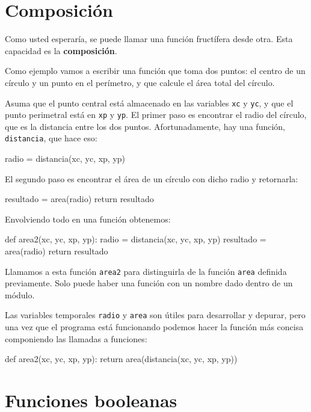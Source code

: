 \section{Composición}

 

Como usted esperaría, se puede llamar una función fructífera desde
otra. Esta capacidad es la \textbf{composición}.

Como ejemplo vamos a escribir una función que toma dos puntos: el
centro de un círculo y un punto en el perímetro, y que calcule el
área total del círculo.

Asuma que el punto central está almacenado en las variables \texttt{xc}
y \texttt{yc}, y que el punto perimetral está en \texttt{xp} y \texttt{yp}.
El primer paso es encontrar el radio del círculo, que es la distancia
entre los dos puntos. Afortunadamente, hay una función, \texttt{distancia},
que hace eso:

\begin{pythoncode}
radio = distancia(xc, yc, xp, yp)
\end{pythoncode}

El segundo paso es encontrar el área de un círculo con dicho radio
y retornarla:

\begin{pythoncode}
resultado = area(radio)
return resultado
\end{pythoncode}
 Envolviendo todo en una función obtenemos:

\begin{pythoncode}
def area2(xc, yc, xp, yp):
  radio = distancia(xc, yc, xp, yp)
  resultado = area(radio)
  return resultado
\end{pythoncode}
Llamamos a esta función \texttt{area2} para distinguirla de la función
\texttt{area} definida previamente. Solo puede haber una función con
un nombre dado dentro de un módulo.

Las variables temporales \texttt{radio} y \texttt{area} son útiles
para desarrollar y depurar, pero una vez que el programa está funcionando
podemos hacer la función más concisa componiendo las llamadas a funciones:

\begin{pythoncode}
def area2(xc, yc, xp, yp):
  return area(distancia(xc, yc, xp, yp))
\end{pythoncode}

\section{Funciones booleanas}

